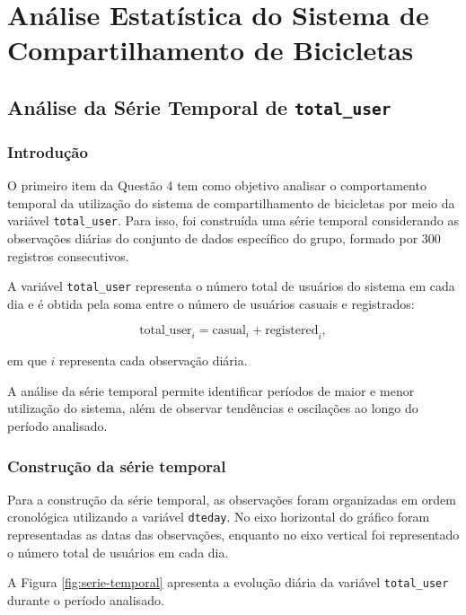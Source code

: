 \documentclass[12pt,a4paper]{article}
\begin{document}
\section{Análise Estatística do Sistema de Compartilhamento de Bicicletas}

\subsection{Análise da Série Temporal de \texttt{total\_user}}

\subsubsection{Introdução}

O primeiro item da Questão 4 tem como objetivo analisar o comportamento temporal
da utilização do sistema de compartilhamento de bicicletas por meio da variável
\texttt{total\_user}. Para isso, foi construída uma série temporal considerando
as observações diárias do conjunto de dados específico do grupo, formado por 300
registros consecutivos.

A variável \texttt{total\_user} representa o número total de usuários do sistema
em cada dia e é obtida pela soma entre o número de usuários casuais e registrados:

\begin{equation}
\text{total\_user}_i =
\text{casual}_i + \text{registered}_i,
\end{equation}

em que $i$ representa cada observação diária.

A análise da série temporal permite identificar períodos de maior e menor
utilização do sistema, além de observar tendências e oscilações ao longo do
período analisado.

\subsubsection{Construção da série temporal}

Para a construção da série temporal, as observações foram organizadas em ordem
cronológica utilizando a variável \texttt{dteday}. No eixo horizontal do gráfico
foram representadas as datas das observações, enquanto no eixo vertical foi
representado o número total de usuários em cada dia.

A Figura \ref{fig:serie-temporal} apresenta a evolução diária da variável
\texttt{total\_user} durante o período analisado.
\end{document}
